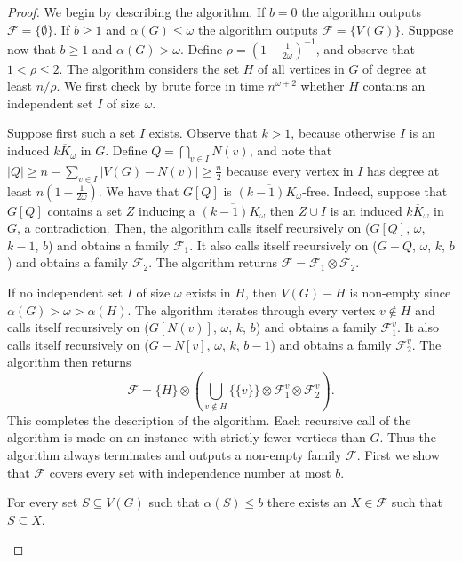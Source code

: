 \documentclass[10pt,a4paper]{amsart}
\newcommand{\cal}{\mathcal}
\begin{document}
\begin{proof}
We begin by describing the algorithm. If $b = 0$ the algorithm outputs ${\cal F} = \{\emptyset\}$. If $b \geq 1$ and $\alpha(G) \leq \omega$ the algorithm outputs ${\cal F} = \{V(G)\}$. Suppose now that $b \geq 1$ and $\alpha(G) > \omega$.
%
Define $\rho = (1 - \frac{1}{2\omega})^{-1}$, and observe that $1 < \rho \leq 2$. The algorithm considers the set $H$ of all vertices in $G$ of degree at least $n/\rho$. 
We first check by brute force in time $n^{\omega+2}$ whether $H$ contains an independent set $I$ of size $\omega$. 

Suppose first such a set $I$ exists. Observe that $k > 1$, because otherwise $I$ is an induced $\overline{kK_\omega}$ in $G$.
%
Define $Q = \bigcap_{v \in I}N(v)$, and note that $|Q| \geq n - \sum_{v \in I} |V(G) - N(v)| \geq \frac{n}{2}$ because every vertex in $I$ has degree at least $n(1-\frac{1}{2\omega})$.
%
We have that $G[Q]$ is $\overline{(k-1)K_\omega}$-free. Indeed, suppose that $G[Q]$ contains a set $Z$ inducing a $\overline{(k-1)K_\omega}$ then $Z \cup I$ is an induced $\overline{kK_\omega}$ in $G$, a contradiction. 
%
Then, the algorithm calls itself recursively on ($G[Q]$, $\omega$, $k-1$, $b$) and obtains a family ${\cal F}_1$. 
%
It also calls itself recursively on ($G - Q$, $\omega$, $k$, $b$) and obtains a family ${\cal F}_2$.
%
The algorithm returns ${\cal F} = {\cal F}_1 \otimes {\cal F}_2$.

If no independent set $I$ of size $\omega$ exists in $H$, then $V(G) - H$ is non-empty since $\alpha(G) > \omega > \alpha(H)$.
%
The algorithm iterates through every vertex $v \notin H$ and calls itself recursively on ($G[N(v)]$, $\omega$, $k$, $b$) and obtains a family ${\cal F}^v_1$. It also calls itself recursively on  ($G - N[v]$, $\omega$, $k$, $b-1$) and obtains a family ${\cal F}^v_2$.
%
The algorithm then returns 
$${\cal F} = \{H\} \otimes\left( \bigcup_{v \notin H} \{\{v\}\} \otimes {\cal F}_1^v \otimes {\cal F}_2^v \right).$$
This completes the description of the algorithm. Each recursive call of the algorithm is made on an instance with strictly fewer vertices than $G$. Thus the algorithm always terminates and outputs a non-empty family ${\cal F}$. 
%
First we show that ${\cal F}$ covers every set with independence number at most $b$.

\begin{claim}\label{clm:family_covers1}
For every set $S \subseteq V(G)$ such that $\alpha(S) \leq b$ there exists an $X \in {\cal F}$ such that $S \subseteq X$.
\end{claim}


\end{proof}
\end{document}
